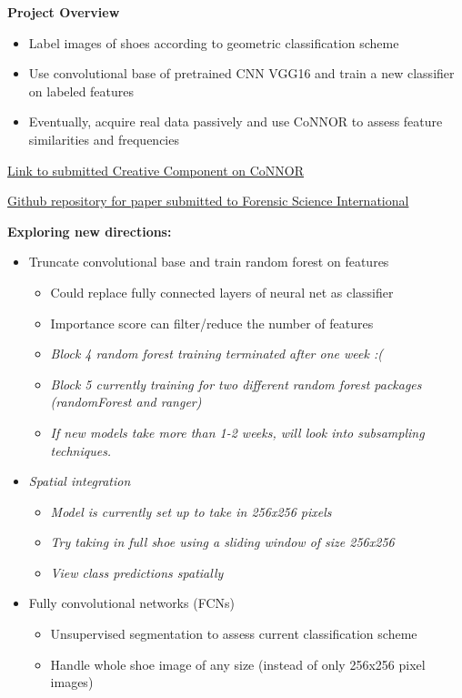 \documentclass[]{book}
\providecommand{\tightlist}{%
  \setlength{\itemsep}{0pt}\setlength{\parskip}{0pt}}
\begin{document}
\textbf{Project Overview}

\begin{itemize}
\tightlist
\item
  Label images of shoes according to geometric classification scheme
\item
  Use convolutional base of pretrained CNN VGG16 and train a new classifier on labeled features
\item
  Eventually, acquire real data passively and use CoNNOR to assess feature similarities and frequencies
\end{itemize}

\href{https://lib.dr.iastate.edu/creativecomponents/264/}{Link to submitted Creative Component on CoNNOR}

\href{https://github.com/srvanderplas/CoNNORFSI}{Github repository for paper submitted to Forensic Science International}

\textbf{Exploring new directions:}

\begin{itemize}
\tightlist
\item
  Truncate convolutional base and train random forest on features

  \begin{itemize}
  \tightlist
  \item
    Could replace fully connected layers of neural net as classifier
  \item
    Importance score can filter/reduce the number of features
  \item
    \emph{Block 4 random forest training terminated after one week :( }
  \item
    \emph{Block 5 currently training for two different random forest packages (randomForest and ranger)}
  \item
    \emph{If new models take more than 1-2 weeks, will look into subsampling techniques.}
  \end{itemize}
\item
  \emph{Spatial integration}

  \begin{itemize}
  \tightlist
  \item
    \emph{Model is currently set up to take in 256x256 pixels}
  \item
    \emph{Try taking in full shoe using a sliding window of size 256x256}
  \item
    \emph{View class predictions spatially}
  \end{itemize}
\item
  Fully convolutional networks (FCNs)

  \begin{itemize}
  \tightlist
  \item
    Unsupervised segmentation to assess current classification scheme
  \item
    Handle whole shoe image of any size (instead of only 256x256 pixel images)
  \end{itemize}
\end{itemize}
\end{document}
